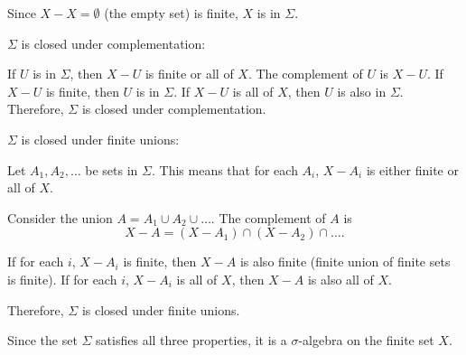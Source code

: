 \documentclass[12pt]{article}
\begin{document}
\par \hspace*{1em}Since $X - X = \emptyset$ (the empty set) is finite, $X$ is in $\Sigma$.

\par \hspace*{1em}$\Sigma$ is closed under complementation:

\par \hspace*{1em}If $U$ is in $\Sigma$, then $X - U$ is finite or all of $X$. The complement of $U$ is $X - U$. If $X - U$ is finite, then $U$ is in $\Sigma$. If $X - U$ is all of $X$, then $U$ is also in $\Sigma$. Therefore, $\Sigma$ is closed under complementation.

\par \hspace*{1em}$\Sigma$ is closed under finite unions:

\par \hspace*{1em}Let $A_1, A_2, \ldots$ be sets in $\Sigma$. This means that for each $A_i$, $X - A_i$ is either finite or all of $X$.

\par \hspace*{1em}Consider the union $A = A_1 \cup A_2 \cup \ldots$. The complement of $A$ is
\[
X - A = (X - A_1) \cap (X - A_2) \cap \ldots.
\]

\par \hspace*{1em}If for each $i$, $X - A_i$ is finite, then $X - A$ is also finite (finite union of finite sets is finite). If for each $i$, $X - A_i$ is all of $X$, then $X - A$ is also all of $X$.

\par \hspace*{1em}Therefore, $\Sigma$ is closed under finite unions.

\par \hspace*{1em}Since the set $\Sigma$ satisfies all three properties, it is a $\sigma$-algebra on the finite set $X$.
\end{document}
